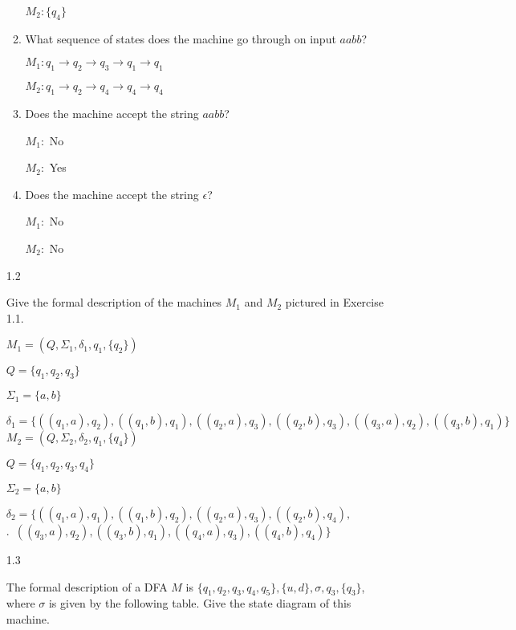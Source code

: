 \begin{enumerate}
\begin{enumerate}
                    $M_2: \{q_4\}$
              \item What sequence of states does the machine go through on input $aabb$?

                    $M_1: q_1 \rightarrow q_2 \rightarrow q_3 \rightarrow q_1 \rightarrow q_1$

                    $M_2: q_1 \rightarrow q_2 \rightarrow q_4 \rightarrow q_4 \rightarrow q_4$
              \item Does the machine accept the string $aabb$?

                    $M_1:$ No

                    $M_2:$ Yes
              \item Does the machine accept the string $\epsilon$?

                    $M_1:$ No

                    $M_2:$ No
          \end{enumerate}

    \item[1.2]

          Give the formal description of the machines $M_1$ and $M_2$ pictured in Exercise 1.1.

          $M_1 = (Q, \Sigma_1, \delta_1, q_1, \{q_2\})$

          $Q = \{q_1, q_2, q_3\}$

          $\Sigma_1 = \{a, b\}$

          $\delta_1 = \{((q_1, a), q_2), ((q_1, b), q_1), ((q_2, a), q_3), ((q_2, b), q_3), ((q_3, a), q_2), ((q_3, b), q_1)\}$\\

          $M_2 = (Q, \Sigma_2, \delta_2, q_1, \{q_4\})$

          $Q = \{q_1, q_2, q_3, q_4\}$

          $\Sigma_2 = \{a, b\}$

          $\delta_2 = \{((q_1, a), q_1), ((q_1, b), q_2), ((q_2, a), q_3), ((q_2, b), q_4),$\\
          .\,\,\,\qquad$((q_3, a), q_2), ((q_3, b), q_1), ((q_4, a), q_3), ((q_4, b), q_4)\}$

    \item[1.3]

          The formal description of a DFA $M$ is $\{q_1,q_2,q_3,q_4,q_5\},\{u,d\},\sigma,q_3,\{q_3\}$, where $\sigma$ is given by the following table. Give the state diagram of this machine.

          \begin{center}



\end{center}
\end{enumerate}
